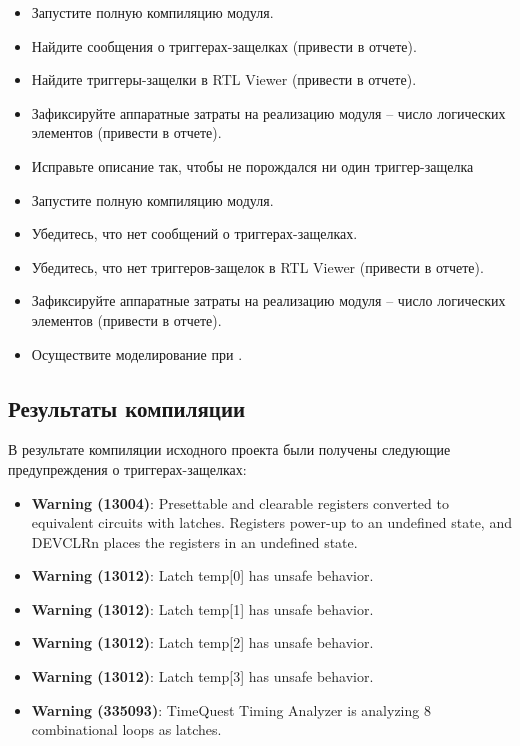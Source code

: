 

\begin{itemize}
	\item Запустите полную компиляцию модуля.
	\item Найдите сообщения о триггерах-защелках (привести в отчете).
	\item Найдите триггеры-защелки в RTL Viewer (привести в отчете).
	\item Зафиксируйте аппаратные затраты на реализацию модуля -- число логических элементов (привести в отчете).
	\item Исправьте описание так, чтобы не порождался ни один триггер-защелка
	\item Запустите полную компиляцию модуля.
	\item Убедитесь, что нет сообщений о триггерах-защелках.
	\item Убедитесь, что нет триггеров-защелок в RTL Viewer (привести в отчете).
	\item Зафиксируйте аппаратные затраты на реализацию модуля -- число логических элементов (привести в отчете).
	\item Осуществите моделирование при .
\end{itemize}

\subsection{Результаты компиляции}

В результате компиляции исходного проекта были получены следующие предупреждения о триггерах-защелках:
\begin{itemize}
	\item \textbf{Warning (13004)}: Presettable and clearable registers converted to equivalent circuits with latches. Registers power-up to an undefined state, and DEVCLRn places the registers in an undefined state.
	\item \textbf{Warning (13012)}: Latch temp[0] has unsafe behavior.
	\item \textbf{Warning (13012)}: Latch temp[1] has unsafe behavior.
	\item \textbf{Warning (13012)}: Latch temp[2] has unsafe behavior.
	\item \textbf{Warning (13012)}: Latch temp[3] has unsafe behavior.
	\item \textbf{Warning (335093)}: TimeQuest Timing Analyzer is analyzing 8 combinational loops as latches.
\end{itemize}

